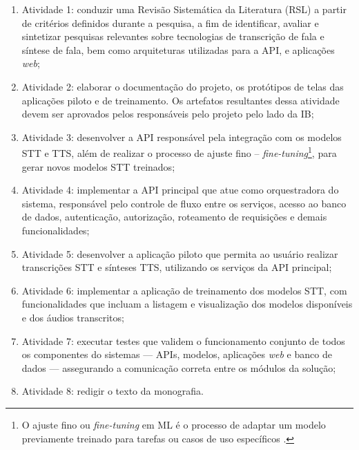 \documentclass[
	12pt,				%
	a4paper,			%
	english,			%
	brazil,				%
	]{article}
\begin{document}
\begin{enumerate}
	\item  Atividade 1: conduzir uma Revisão Sistemática da Literatura (RSL) a partir de critérios definidos durante a pesquisa, a fim de identificar, avaliar e sintetizar pesquisas relevantes sobre tecnologias de transcrição de fala e síntese de fala, bem como arquiteturas utilizadas para a API,  e aplicações \textit{web}; \label{atv1}
	
	
	\item Atividade 2: elaborar o documentação do projeto, os protótipos de telas das aplicações piloto e de treinamento. Os artefatos resultantes dessa atividade devem ser aprovados pelos responsáveis pelo projeto pelo lado da IB; \label{atv2}
	
	
	\item Atividade 3: desenvolver a API responsável pela integração com os modelos STT e TTS, além de realizar o processo de ajuste fino – \textit{fine-tuning}\footnote{O ajuste fino ou \textit{fine-tuning} em ML é o processo de adaptar um modelo previamente treinado para tarefas ou casos de uso específicos \cite{bergmann2024}.}, para gerar novos modelos STT treinados; \label{atv3}
	
	
	\item Atividade 4: implementar a API principal que atue como orquestradora do sistema, responsável pelo controle de fluxo entre os serviços, acesso ao banco de dados, autenticação, autorização, roteamento de requisições e demais funcionalidades; \label{atv4}
	
	\item Atividade 5: desenvolver a aplicação piloto que permita ao usuário realizar transcrições STT e sínteses TTS, utilizando os serviços da API principal; \label{atv5}
	
	\item Atividade 6: implementar a aplicação de treinamento dos modelos STT, com funcionalidades que incluam a listagem e visualização dos modelos disponíveis e dos áudios transcritos; \label{atv6}
	
	\item Atividade 7: executar testes que validem o funcionamento conjunto de todos os componentes do sistemas — APIs, modelos, aplicações \textit{web} e banco de dados — assegurando a comunicação correta entre os módulos da solução; \label{atv7}
	
	\item Atividade 8: redigir o texto da monografia. \label{atv8}
\end{enumerate}
\end{document}
